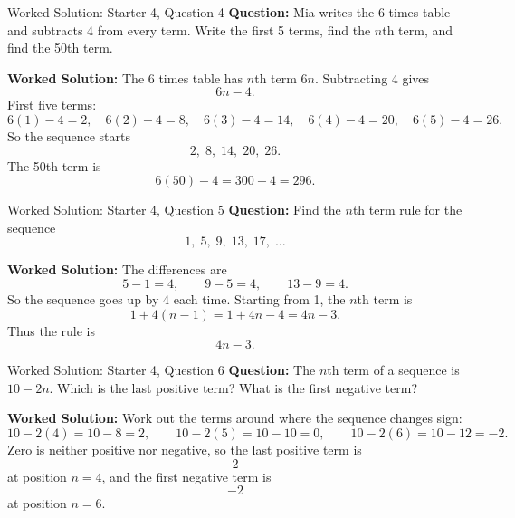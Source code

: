 \documentclass{beamer}
\begin{document}
\begin{frame}{Worked Solution: Starter 4, Question 4}
\textbf{Question:} Mia writes the 6 times table and subtracts 4 from every term. Write the first 5 terms, find the $n$th term, and find the 50th term.

\textbf{Worked Solution:} The 6 times table has $n$th term $6n$. Subtracting 4 gives
\[
6n-4.
\]
First five terms:
\[
6(1)-4=2,\quad 6(2)-4=8,\quad 6(3)-4=14,\quad 6(4)-4=20,\quad 6(5)-4=26.
\]
So the sequence starts
\[
2,\;8,\;14,\;20,\;26.
\]
The 50th term is
\[
6(50)-4=300-4=296.
\]
\end{frame}

\begin{frame}{Worked Solution: Starter 4, Question 5}
\textbf{Question:} Find the $n$th term rule for the sequence
\[
1,\;5,\;9,\;13,\;17,\;\ldots
\]

\textbf{Worked Solution:} The differences are
\[
5-1=4,\qquad 9-5=4,\qquad 13-9=4.
\]
So the sequence goes up by 4 each time. Starting from 1, the $n$th term is
\[
1+4(n-1)=1+4n-4=4n-3.
\]
Thus the rule is
\[
4n-3.
\]
\end{frame}

\begin{frame}{Worked Solution: Starter 4, Question 6}
\textbf{Question:} The $n$th term of a sequence is $10-2n$. Which is the last positive term? What is the first negative term?

\textbf{Worked Solution:} Work out the terms around where the sequence changes sign:
\[
10-2(4)=10-8=2,\qquad 10-2(5)=10-10=0,\qquad 10-2(6)=10-12=-2.
\]
Zero is neither positive nor negative, so the last positive term is
\[
2
\]
at position $n=4$, and the first negative term is
\[
-2
\]
at position $n=6$.
\end{frame}
\end{document}
